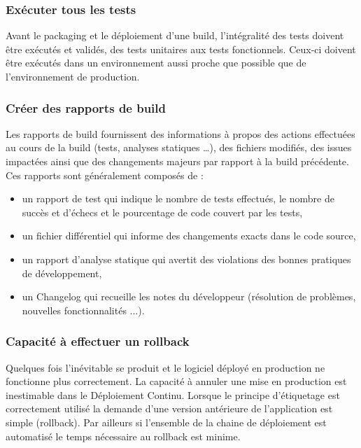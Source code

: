       \subsubsection{Exécuter tous les tests}
      Avant le packaging et le déploiement d’une build, l’intégralité des tests doivent être exécutés et validés, des tests unitaires aux tests fonctionnels. Ceux-ci doivent être exécutés dans un environnement aussi proche que possible que de l’environnement de production.

      \subsubsection{Créer des rapports de build}
      Les rapports de build fournissent des informations à propos des actions effectuées au cours de la build (tests, analyses statiques …), des fichiers modifiés, des issues impactées ainsi que des changements majeurs par rapport à la build précédente. Ces rapports sont généralement composés de :\\
      \begin{itemize}
        \item un rapport de test qui indique le nombre de tests effectués, le nombre de succès et d’échecs et le pourcentage de code couvert par les tests,
        \item un fichier différentiel qui informe des changements exacts dans le code source,
        \item un rapport d’analyse statique qui avertit des violations des bonnes pratiques de développement,
        \item un Changelog qui recueille les notes du développeur (résolution de problèmes, nouvelles fonctionnalités ...).\\
      \end{itemize}

      \subsubsection{Capacité à effectuer un rollback}
      Quelques fois l’inévitable se produit et le logiciel déployé en production ne fonctionne plus correctement. La capacité à annuler une mise en production est inestimable dans le Déploiement Continu. Lorsque le principe d’étiquetage est correctement utilisé la demande d’une version antérieure de l’application est simple (rollback). Par ailleurs si l’ensemble de la chaine de déploiement est automatisé le temps nécessaire au rollback est minime.

